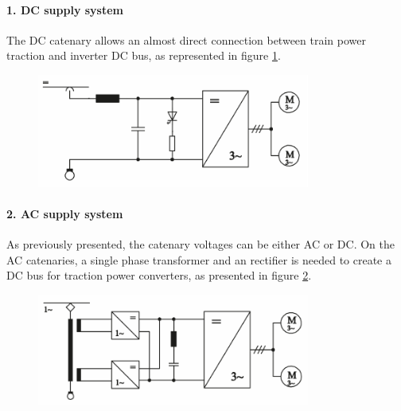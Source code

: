 \paragraph{1. \ac{DC} supply system\\}


The \ac{DC} catenary allows an almost direct connection between train power traction and inverter DC bus, as represented in figure \ref{fig:steimel2008a}.


\begin{figure}[h!]
	\centering
	\begin{minipage}{.6\textwidth}
		\centering
		\includegraphics[width=0.8\textwidth,keepaspectratio]{figures/31.PowerS/steimel2008a}
		\label{fig:steimel2008a}
	\end{minipage}
\end{figure}


\paragraph{2. \ac{AC} supply system\\}

As previously presented, the catenary voltages can be either \ac{AC} or \ac{DC}. On the AC catenaries, a single phase transformer and an rectifier is needed to create a \ac{DC} bus for traction power converters, as presented in figure \ref{fig:steimel2008b}.

\begin{figure}[h!]
	\centering
	\begin{minipage}{.6\textwidth}
		\centering
		\includegraphics[width=0.8\textwidth,keepaspectratio]{figures/31.PowerS/steimel2008b}
		\label{fig:steimel2008b}
	\end{minipage}
\end{figure}




